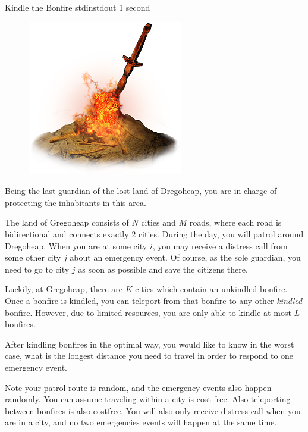 \begin{problem}{Kindle the Bonfire}
{stdin}{stdout}
{1 second}{}{}

\begin{figure}
    \includegraphics[scale=0.5]{bonfire.png}
\end{figure}

Being the last guardian of the lost land of Dregoheap, you are in charge 
of protecting the inhabitants in this area.

The land of Gregoheap consists of $N$ cities and $M$ roads, where each road
is bidirectional and connects exactly $2$ cities. During the day, you will
patrol around Dregoheap. When you are at some city $i$, you may receive a
distress call from some other city $j$ about an emergency event. Of course, as 
the sole guardian, you need to go to city $j$ as soon as possible  and save the
citizens there.

Luckily, at Gregoheap, there are $K$ cities which contain an unkindled bonfire.
Once a bonfire is kindled, you can teleport from that bonfire to any other 
\textit{kindled} bonfire. However, due to limited resources, you are only able 
to kindle at most $L$ bonfires.

After kindling bonfires in the optimal way,
you would like to know in the worst case, what is the longest distance you need
to travel in order to respond to one emergency event.

Note your patrol route is random, and the emergency events also happen 
randomly. You can assume traveling within a city is cost-free. Also 
teleporting between bonfires is also costfree. You will also only receive 
distress call when you are in a city, and no two emergencies events will happen
at the same time.

\InputFile


\end{problem}
